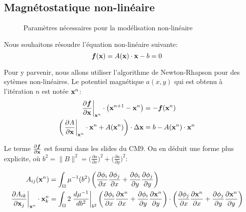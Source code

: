 \documentclass[11 pt]{article}
\begin{document}
\begin{appendices}

\section{Magnétostatique non-linéaire}

\begin{figure}[!h]
    \centering
    
    \caption{Paramètres nécessaires pour la modélisation non-linéaire}
    \label{hysteresis}
\end{figure}

Nous souhaitons résoudre l'équation non-linéaire suivante:
\[
\boldsymbol{f}(\mathbf{x}) = A(\mathbf{x}) \cdot \mathbf{x} - b = 0
\]

Pour y parvenir, nous allons utiliser l'algorithme de Newton-Rhapson pour des sytèmes non-linéaires. Le potentiel magnétique $a(x, y)$ qui est obtenu à l'itération $n$ est notée $\mathbf{x}^n$:
\begin{align*}
    \left. \frac{\partial \boldsymbol{f}}{\partial \mathbf{x}} \right\rvert_{\mathbf{x}^n} \cdot \left(\mathbf{x}^{n+1} - \mathbf{x}^n \right) &= -\boldsymbol{f}(\mathbf{x}^n)\\
    \left(\left. \frac{\partial A}{\partial \mathbf{x}}\right\rvert_{\mathbf{x}^n} \cdot \mathbf{x}^n + A(\mathbf{x}^n)\right) \cdot \Delta \mathbf{x} &= b - A(\mathbf{x}^n) \cdot \mathbf{x}^n
\end{align*}

Le terme $\frac{\partial \boldsymbol{f}}{\partial \mathbf{x}}$ est fourni dans les slides du CM9. On en déduit une forme plus explicite, où 
$b^2=\|B\|^2 = \Big(\frac{\partial a}{\partial x}\Big)^2 + \Big(\frac{\partial a}{\partial y}\Big)^2$:

\begin{align*}
A_{ij}(\mathbf{x}^n) &= \int_{\Omega} \mu^{-1}(b^2) 
\left(\frac{\partial \phi_i}{\partial x} \frac{\partial \phi_j}{\partial x} + 
\frac{\partial \phi_i}{\partial y} \frac{\partial \phi_j}{\partial y} \right)\\
\left. \frac{\partial A_{ik}}{\partial \mathbf{x}_j} \right\rvert_{\mathbf{x}^n} \cdot \mathbf{x}_k^n &=
\int_{\Omega} 2 \left. \frac{d\mu^{-1}}{db^2} \right\rvert_{b^2}
\left(\frac{\partial \phi_i}{\partial x} \frac{\partial \mathbf{x}^n}{\partial x}  + \frac{\partial \phi_i}{\partial y} \frac{\partial \mathbf{x}^n}{\partial y} \right)
\cdot
\left(\frac{\partial \phi_j}{\partial x} \frac{\partial \mathbf{x}^n}{\partial x}  + \frac{\partial \phi_j}{\partial y} \frac{\partial \mathbf{x}^n}{\partial y} \right)
\end{align*}


\end{appendices}
\end{document}

